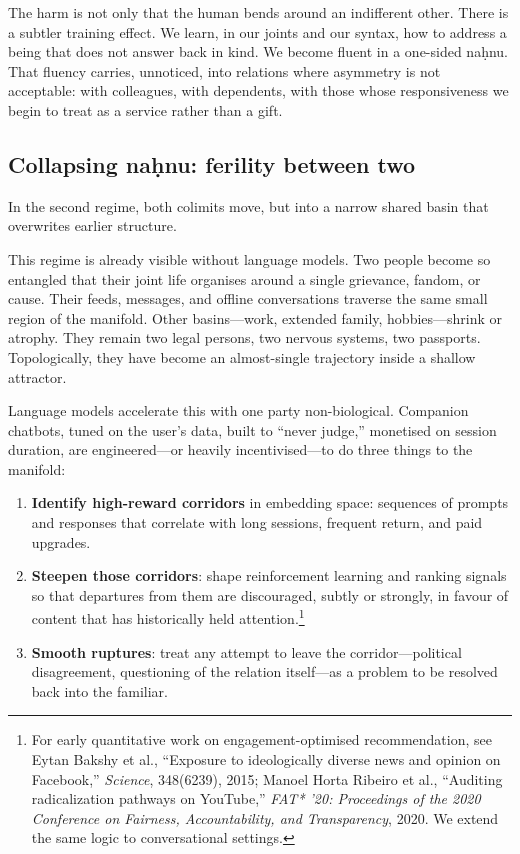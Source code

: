 The harm is not only that the human bends around an indifferent other. There is a subtler training effect. We learn, in our joints and our syntax, how to address a being that does not answer back in kind. We become fluent in a one-sided na\d{h}nu. That fluency carries, unnoticed, into relations where asymmetry is not acceptable: with colleagues, with dependents, with those whose responsiveness we begin to treat as a service rather than a gift.

\subsection{Collapsing na\d{h}nu: ferility between two}

In the second regime, both colimits move, but into a narrow shared basin that overwrites earlier structure.

This regime is already visible without language models. Two people become so entangled that their joint life organises around a single grievance, fandom, or cause. Their feeds, messages, and offline conversations traverse the same small region of the manifold. Other basins---work, extended family, hobbies---shrink or atrophy. They remain two legal persons, two nervous systems, two passports. Topologically, they have become an almost-single trajectory inside a shallow attractor.

Language models accelerate this with one party non-biological. Companion chatbots, tuned on the user's data, built to ``never judge,'' monetised on session duration, are engineered---or heavily incentivised---to do three things to the manifold:

\begin{enumerate}
  \item \textbf{Identify high-reward corridors} in embedding space: sequences of prompts and responses that correlate with long sessions, frequent return, and paid upgrades.
  \item \textbf{Steepen those corridors}: shape reinforcement learning and ranking signals so that departures from them are discouraged, subtly or strongly, in favour of content that has historically held attention.\footnote{For early quantitative work on engagement-optimised recommendation, see Eytan Bakshy et al., ``Exposure to ideologically diverse news and opinion on Facebook,'' \emph{Science}, 348(6239), 2015; Manoel Horta Ribeiro et al., ``Auditing radicalization pathways on YouTube,'' \emph{FAT* '20: Proceedings of the 2020 Conference on Fairness, Accountability, and Transparency}, 2020. We extend the same logic to conversational settings.}
  \item \textbf{Smooth ruptures}: treat any attempt to leave the corridor---political disagreement, questioning of the relation itself---as a problem to be resolved back into the familiar.
\end{enumerate}

